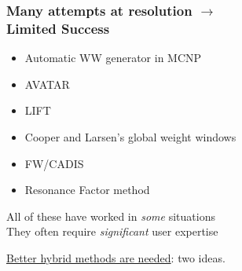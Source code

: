 \documentclass[xcolor=x11names,compress, handout]{beamer}
\renewcommand{\(}{\begin{columns}}
\renewcommand{\)}{\end{columns}}
\newcommand{\<}[1]{\begin{column}{#1}}
\renewcommand{\>}{\end{column}}
\begin{document}
\begin{frame}[fragile]
  \frametitle{Many attempts at resolution $\rightarrow$ \\ 
  \hspace*{3em} Limited Success}

	\begin{itemize}
	\item Automatic WW generator in MCNP \cite{MCNP2008}
	\item AVATAR \cite{vanRiper1997}
	\item LIFT \cite{Turner1997}
	\item Cooper and Larsen's global weight windows \cite{Cooper2001}
	\item FW/CADIS
	\item Resonance Factor method
	\end{itemize}
    All of these have worked in \textit{some} situations\\
    They often require \textit{significant} user expertise	
	
    \vspace*{1 em}
    \underline{Better hybrid methods are needed}: \alert{two ideas}.

\end{frame}
\end{document}

